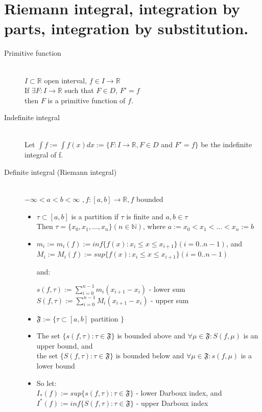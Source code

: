 \documentclass[margin=0px]{article}
\newcommand{\R}{\mathbb{R}}
\begin{document}
\section{Riemann integral, integration by parts, integration by substitution.}
\begin{description}
    \item[Primitive function] \hfill \\
        $ I \subset \R $ open interval, $ f \in I \rightarrow \R $ \\
        If $ \exists  F:I\rightarrow\R $ such that $ F \in D $, $F' = f$ \\
        then $ F $ is a primitive function of $ f $.

    \item[Indefinite integral] \hfill \\
        Let $ \int{f} := \int f(x)dx :=  \{F:I \rightarrow \R, F \in D $
        and $ F' = f  \} $ be the indefinite integral of f.

    \item[Definite integral (Riemann integral)] \hfill \\
        $ -\infty < a < b < \infty$
        $, f:[a,b] \rightarrow \R, f $ bounded
        \begin{itemize}
            \item
                  $ \tau \subset [a,b] $ is a partition if $ \tau $ is finite and $ a,b \in \tau $ \\
                  Then $ \tau = \{x_0, x_1, ..., x_n \} (n \in \mathbb{N}) $, where
                  $ a := x_0 < x_1 < ... < x_n := b$
            \item
                  $ m_i := m_i(f) := inf\{f(x): x_i \leq x \leq x_{i+1} \} (i = 0..n-1)$, and \\
                  $ M_i := M_i(f) := sup\{f(x): x_i \leq x \leq x_{i+1} \} (i = 0..n-1)$

                  and:

                  $ s(f, \tau) := \sum\limits_{i=0}^{n-1} m_i(x_{i+1} - x_i) $ - lower sum \\
                  $ S(f, \tau) := \sum\limits_{i=0}^{n-1} M_i(x_{i+1} - x_i) $ - upper sum

            \item
                  $ \mathfrak{F} := \{ \tau \subset [a,b] $ partition $\}$
            \item
                  The set $ \{ s(f, \tau): \tau \in \mathfrak{F} \} $ is bounded above and $ \forall \mu \in \mathfrak{F} : S(f, \mu) $ is an upper bound, and \\
                  the set $ \{ S(f, \tau): \tau \in \mathfrak{F} \} $ is bounded below and $ \forall \mu \in \mathfrak{F} : s(f, \mu) $ is a lower bound
            \item
                  So let: \\ $ I_*(f) := sup\{ s(f,\tau) : \tau \in \mathfrak{F} \}$ - lower Darboux index, and \\
                  $ I^*(f) := inf\{ S(f,\tau) : \tau \in \mathfrak{F} \}$ - upper Darboux index
        \end{itemize}


\end{description}
\end{document}
